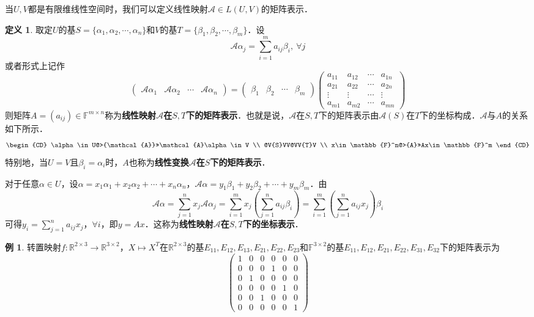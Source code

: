 \documentclass[a4paper,fontset=windows]{ctexbook}
\theoremstyle{definition}
\newtheorem{definition}{定义}[chapter]
\newtheorem{example}{例}[chapter]
\begin{document}
当$U,V$都是有限维线性空间时，我们可以定义线性映射$\mathcal{A}\in L(U,V)$的矩阵表示．

\begin{definition}
取定$U$的基$S=\{\alpha_1,\alpha_2,\cdots,\alpha_n\}$和$V$的基$T=\{\beta_1,\beta_2,\cdots,\beta_m\}$．设
$$\mathcal{A}\alpha_j=\sum_{i=1}^ma_{ij}\beta_i,~\forall j$$
或者形式上记作
$$\begin{pmatrix}\mathcal{A}\alpha_1&\mathcal{A}\alpha_2&\cdots&\mathcal{A}\alpha_n\end{pmatrix}=\begin{pmatrix}\beta_1&\beta_2&\cdots&\beta_m\end{pmatrix}\begin{pmatrix}a_{11}&a_{12}&\cdots&a_{1n} \\ a_{21}&a_{22}&\cdots&a_{2n} \\ \vdots&\vdots&\cdots&\vdots \\ a_{m1}&a_{m2}&\cdots&a_{mn}\end{pmatrix}$$
则矩阵$A=(a_{ij})\in\mathbb{F}^{m\times n}$称为{\bf 线性映射$\mathcal{A}$在$S,T$下的矩阵表示}．也就是说，$\mathcal{A}$在$S,T$下的矩阵表示由$\mathcal{A}(S)$在$T$下的坐标构成．$\mathcal{A}$与$A$的关系如下所示．
$$\begin{CD}
\alpha\in U@>{\mathcal{A}}>>\mathcal{A}\alpha\in V \\
@V{S}VV@VV{T}V \\
x\in\mathbb{F}^n@>{A}>>Ax\in\mathbb{F}^m
\end{CD}$$
特别地，当$U=V$且$\beta_i=\alpha_i$时，$A$也称为{\bf 线性变换$\mathcal{A}$在$S$下的矩阵表示}．

对于任意$\alpha\in U$，设$\alpha=x_1\alpha_1+x_2\alpha_2+\cdots+x_n\alpha_n$，$\mathcal{A}\alpha=y_1\beta_1+y_2\beta_2+\cdots+y_m\beta_m$．由
$$\mathcal{A}\alpha=\sum_{j=1}^nx_j\mathcal{A}\alpha_j=\sum_{i=1}^mx_j\left(\sum_{j=1}^na_{ij}\beta_i\right)=\sum_{i=1}^m\left(\sum_{j=1}^na_{ij}x_j\right)\beta_i$$
可得$y_i=\sum\limits_{j=1}^na_{ij}x_j$，$\forall i$，即$y=Ax$．这称为{\bf 线性映射$\mathcal{A}$在$S,T$下的坐标表示}．
\end{definition}

\begin{example}
转置映射$f:\mathbb{R}^{2\times 3}\to\mathbb{R}^{3\times 2}$，$X\mapsto X^T$在$\mathbb{R}^{2\times 3}$的基$E_{11},E_{12},E_{13},E_{21},E_{22},E_{23}$和$\mathbb{F}^{3\times 2}$的基$E_{11},E_{12},E_{21},E_{22},E_{31},E_{32}$下的矩阵表示为
$$\begin{pmatrix}1&0&0&0&0&0 \\ 0&0&0&1&0&0 \\ 0&1&0&0&0&0 \\ 0&0&0&0&1&0 \\ 0&0&1&0&0&0 \\ 0&0&0&0&0&1\end{pmatrix}$$
\end{example}
\end{document}

